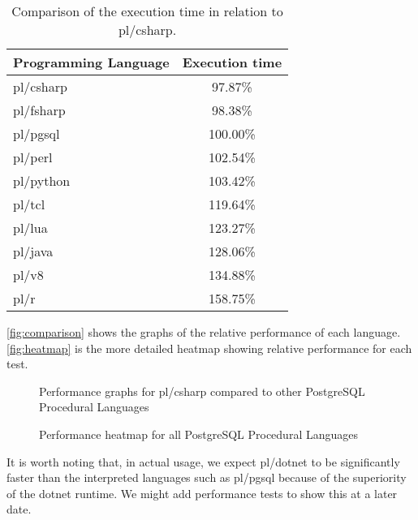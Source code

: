 \documentclass[sigconf,techreport,authorversion,nonacm]{acmart}
\begin{document}
\begin{table}[!htbp]
       \caption{Comparison of the execution time in relation to pl/csharp.}
       \begin{tabular}{l | c }
               \toprule
               \rowcolor{gray!25} \textbf{Programming Language} & \textbf{Execution time} \\ \midrule
                pl/csharp  & 97.87\% \\
                pl/fsharp  & 98.38\% \\
                pl/pgsql   & 100.00\% \\
                pl/perl    & 102.54\% \\
                pl/python  & 103.42\% \\
                pl/tcl     & 119.64\% \\
                pl/lua     & 123.27\% \\
                pl/java    & 128.06\% \\
                pl/v8      & 134.88\% \\
                pl/r       & 158.75\% \\ \bottomrule
       \end{tabular}
\end{table}

\autoref{fig:comparison} shows the graphs of the relative performance
of each language.  \autoref{fig:heatmap} is the more detailed heatmap
showing relative performance for each test.

\begin{figure*}[!htbp]
        \centering
        \caption{\centering Performance graphs for pl/csharp compared to other PostgreSQL Procedural Languages}
        \label{fig:comparison}
\end{figure*}

\begin{figure*}[!htbp]
        \centering
        \caption{\centering Performance heatmap for all PostgreSQL Procedural Languages}
        \label{fig:heatmap}
\end{figure*}

It is worth noting that, in actual usage, we expect pl/dotnet to be
significantly faster than the interpreted languages such as pl/pgsql
because of the superiority of the dotnet runtime.  We might add
performance tests to show this at a later date.
\end{document}
